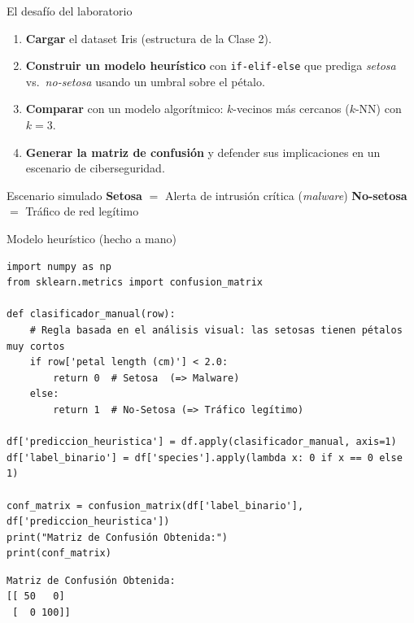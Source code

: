 \documentclass[10pt,aspectratio=169]{beamer}
\begin{document}
\begin{frame}{El desafío del laboratorio}
  \begin{enumerate}
    \item \textbf{Cargar} el dataset Iris (estructura de la Clase 2).
    \item \textbf{Construir un modelo heurístico} con \texttt{if-elif-else} que prediga \emph{setosa} vs.\ \emph{no-setosa} usando un umbral sobre el pétalo.
    \item \textbf{Comparar} con un modelo algorítmico: $k$-vecinos más cercanos ($k$-NN) con $k=3$.
    \item \textbf{Generar la matriz de confusión} y defender sus implicaciones en un escenario de ciberseguridad.
  \end{enumerate}
  \vfill
  \begin{alertblock}{Escenario simulado}
    \centering
    \textbf{Setosa} $=$ Alerta de intrusión crítica (\emph{malware}) \qquad
    \textbf{No-setosa} $=$ Tráfico de red legítimo
  \end{alertblock}
\end{frame}

\begin{frame}[fragile]{Modelo heurístico (hecho a mano)}
  \begin{lstlisting}
import numpy as np
from sklearn.metrics import confusion_matrix

def clasificador_manual(row):
    # Regla basada en el análisis visual: las setosas tienen pétalos muy cortos
    if row['petal length (cm)'] < 2.0:
        return 0  # Setosa  (=> Malware)
    else:
        return 1  # No-Setosa (=> Tráfico legítimo)

df['prediccion_heuristica'] = df.apply(clasificador_manual, axis=1)
df['label_binario'] = df['species'].apply(lambda x: 0 if x == 0 else 1)

conf_matrix = confusion_matrix(df['label_binario'], df['prediccion_heuristica'])
print("Matriz de Confusión Obtenida:")
print(conf_matrix)
  \end{lstlisting}
  \begin{lstlisting}[style=salida]
Matriz de Confusión Obtenida:
[[ 50   0]
 [  0 100]]
  \end{lstlisting}
\end{frame}
\end{document}
